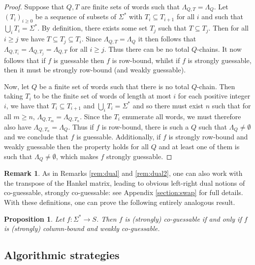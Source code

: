 \documentclass[10pt,a4paper]{amsart}
\newtheorem{prop}[thm]{Proposition}
\theoremstyle{definition}
\newtheorem{rem}[thm]{Remark}
\numberwithin{equation}{section}
\numberwithin{theorem}{section}
\begin{document}
\begin{proof} Suppose that $Q, T$ are finite sets of words such that $\Lambda_{Q, T}=\Lambda_{Q}$. Let $(T_i)_{i \geq0}$ be a sequence of subsets of $\Sigma^*$ with $T_i \subseteq T_{i+1}$ for all $i$ and such that $\bigcup_i T_i = \Sigma^*$. By definition, there exists some set $T_j$ such that $T \subseteq T_j$. Then for all $i\geq j$ we have $T \subseteq T_j \subseteq T_i$. Since $\Lambda_{Q, T}=\Lambda_{Q}$ it then follows that $\Lambda_{Q, T_i} = \Lambda_{Q, T_j} = \Lambda_{Q, T}$ for all $i \geq j$. Thus there can be no total $Q$-chains. It now follows that if $f$ is guessable then $f$ is row-bound, whilst if $f$ is strongly guessable, then it must be strongly row-bound (and weakly guessable).
	
	Now, let $Q$ be a finite set of words such that there is no total $Q$-chain. Then taking $T_i$ to be the finite set of words of length at most $i$  for each positive integer $i$, we have that $T_i \subseteq T_{i+1}$ and $\bigcup_i T_i = \Sigma^*$ and so there must exist $n$ such that for all $m\geq n$, $\Lambda_{Q, T_m} = \Lambda_{Q, T_n}$. Since the $T_i$ enumerate all words, we must therefore also have $\Lambda_{Q, T_n} = \Lambda_{Q}$.  Thus if $f$ is row-bound, there is such a $Q$ such that $\Lambda_Q \neq \emptyset$ and we conclude that $f$ is guessable. Additionally, if $f$ is strongly row-bound and weakly guessable then the property holds for all $Q$ and at least one of them is such that $\Lambda_Q \neq \emptyset$, which makes $f$ strongly guessable.
\end{proof} %

\begin{rem}
\label{rem:dual3}
As in Remarks \ref{rem:dual} and \ref{rem:dual2}, one can also work with the transpose of the Hankel matrix, leading to obvious left-right dual notions of co-guessable, strongly co-guessable: see Appendix \ref{section:swap} for full details. With these definitions, one can prove the following entirely analogous result.
\end{rem}


\begin{prop}
	\label{prop:coguessable}
	Let $f:\Sigma^* \to S$. Then $f$ is (strongly) co-guessable if and only if $f$ is (strongly) column-bound and weakly co-guessable.  
\end{prop}

\subsection{Algorithmic strategies}
\end{document}

